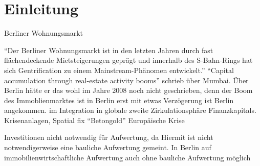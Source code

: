 \section{Einleitung}
 Berliner Wohnungsmarkt

"`Der Berliner Wohnungsmarkt ist in den letzten Jahren durch fast flächendeckende Mietsteigerungen geprägt und innerhalb des S-Bahn-Rings hat sich Gentrification zu einem Mainstream-Phänomen entwickelt."' \citep[S.~29]{Berner2015}
"`Capital accumulation through real-estate activity booms"' schrieb \citet[S.~35]{Harvey2008} über Mumbai. Über Berlin hätte er das wohl im Jahre 2008 noch nicht geschrieben, denn der Boom des Immoblienmarktes ist in Berlin erst mit etwas Verzögerung ist Berlin angekommen. im Integration in globale zweite Zirkulationsphäre Finanzkapitals. Krisenanlagen, Spatial fix "`Betongold"' Europäische Krise 

Investitionen nicht notwendig für Aufwertung, da 
Hiermit ist nicht notwendigerweise eine bauliche Aufwertung gemeint. In Berlin auf immobilienwirtschaftliche Aufwertung auch ohne bauliche Aufwertung möglich \citep[S.~30]{Berner2015} 

 

